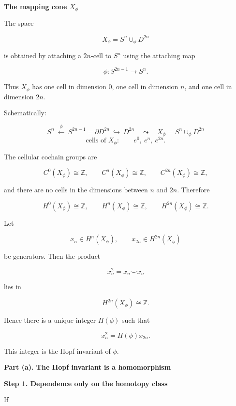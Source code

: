 \begin{solution}

\medskip
\noindent\textbf{The mapping cone \(X_\phi\)}\par
\smallskip


The space

\[
X_\phi=S^n\cup_\phi D^{2n}
\]

is obtained by attaching a \(2n\)-cell to \(S^n\) using the attaching map

\[
\phi:S^{2n-1}\to S^n.
\]

Thus \(X_\phi\) has one cell in dimension \(0\), one cell in dimension \(n\), and one cell in dimension \(2n\).

Schematically:



\[
\boxed{
S^n
\ \xleftarrow{\ \phi\ }\ 
S^{2n-1}=\partial D^{2n}
\ \hookrightarrow\
D^{2n}
\quad\leadsto\quad
X_\phi=S^n\cup_\phi D^{2n}}
\]
\[
\text{cells of }X_\phi:\qquad e^0,\ e^n,\ e^{2n}.
\]



The cellular cochain groups are

\[
C^0(X_\phi)\cong \mathbb Z,
\qquad
C^n(X_\phi)\cong \mathbb Z,
\qquad
C^{2n}(X_\phi)\cong \mathbb Z,
\]

and there are no cells in the dimensions between \(n\) and \(2n\). Therefore

\[
H^0(X_\phi)\cong \mathbb Z,
\qquad
H^n(X_\phi)\cong \mathbb Z,
\qquad
H^{2n}(X_\phi)\cong \mathbb Z.
\]

Let

\[
x_n\in H^n(X_\phi),
\qquad
x_{2n}\in H^{2n}(X_\phi)
\]

be generators. Then the product

\[
x_n^2=x_n\smile x_n
\]

lies in

\[
H^{2n}(X_\phi)\cong \mathbb Z.
\]

Hence there is a unique integer \(H(\phi)\) such that

\[
\boxed{
	x_n^2=H(\phi)x_{2n}.
}
\]

This integer is the Hopf invariant of \(\phi\).


\medskip
\noindent\textbf{Part (a). The Hopf invariant is a homomorphism}\par
\smallskip


\medskip
\noindent\textbf{Step 1. Dependence only on the homotopy class}\par
\smallskip


If


\end{solution}
